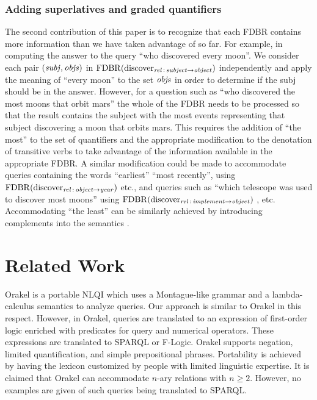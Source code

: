 \documentclass[../main.tex]{subfiles}
\begin{document}
\begin{refsection}
\subsubsection{Adding superlatives and graded quantifiers}
The second contribution of this paper is to recognize that each FDBR contains more information than we
have taken advantage of so far. For example, in computing the answer to the query ``who discovered
every moon''. We consider each pair $(\operatorname{\mathit{subj}}, \operatorname{\mathit{objs}})$ in $\operatorname{FDBR}({\operatorname{discover}_{\operatorname{\mathit{rel}}\,:\,\operatorname{\mathit{subject}} \rightarrow \operatorname{\mathit{object}}}})$
independently and apply the meaning of ``every moon'' to the set $\operatorname{\mathit{objs}}$ in order to determine if the
subj should be in the answer. However, for a question such as ``who discovered the most moons that
orbit mars'' the whole of the FDBR needs to be processed so that the result contains the subject with
the most events representing that subject discovering a moon that orbits mars. This requires the
addition of ``the most'' to the set of quantifiers and the appropriate modification to the denotation of
transitive verbs to take advantage of the information available in the appropriate FDBR. A similar
modification could be made to accommodate queries containing the words ``earliest'' ``most recently'', using $\operatorname{FDBR}({\operatorname{discover}_{\operatorname{\mathit{rel}}\,:\,\operatorname{\mathit{object}} \rightarrow \operatorname{\mathit{year}}}})$ etc., and queries such as ``which telescope was used to discover most
moons'' using $\operatorname{FDBR}({\operatorname{discover}_{\operatorname{\mathit{rel}}\,:\,\operatorname{\mathit{implement}} \rightarrow \operatorname{\mathit{object}}}})$ , etc.  Accommodating ``the least'' can be similarly achieved by introducing complements into the semantics \cite{peelarfrostwebist2020}.

\section{Related Work}
\label{ext:relatedwork}
Orakel \cite{cimiano:haase} is a portable NLQI which uses a Montague-like grammar and a lambda-calculus semantics to analyze queries. Our approach is similar to Orakel in this respect. However, in Orakel, queries are translated to an expression of first-order logic enriched with predicates for query and numerical operators. These expressions are translated to SPARQL or F-Logic. Orakel supports negation, limited quantification, and simple prepositional phrases. Portability is achieved by having the lexicon customized by people with limited linguistic expertise. It is claimed that Orakel can accommodate $n$-ary relations with $n \geq 2$. However, no examples are given of such queries being translated to SPARQL.


\end{refsection}
\end{document}
